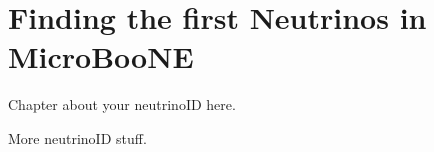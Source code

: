 \chapter{Finding the first Neutrinos in MicroBooNE} \label{ch:neutrinoID}
Chapter about your neutrinoID here.

\clearpage
More neutrinoID stuff.
